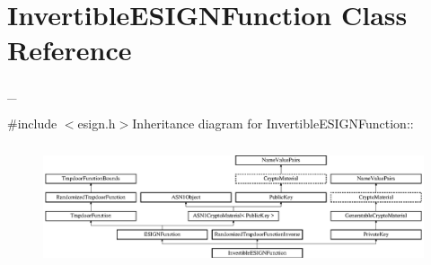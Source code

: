 \hypertarget{class_invertible_e_s_i_g_n_function}{
\section{InvertibleESIGNFunction Class Reference}
\label{class_invertible_e_s_i_g_n_function}
}


\_\-  


{\ttfamily \#include $<$esign.h$>$}Inheritance diagram for InvertibleESIGNFunction::\begin{figure}[H]
\begin{center}
\leavevmode
\includegraphics[height=3.63636cm]{class_invertible_e_s_i_g_n_function}
\end{center}
\end{figure}
